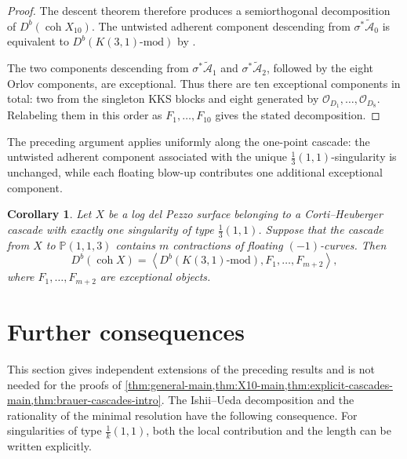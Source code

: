 \documentclass[11pt]{article}
\theoremstyle{plain}
\newtheorem{corollary}[corollary]{Corollary}
\theoremstyle{definition}
\theoremstyle{remark}
\newcommand{\Pp}{\mathbb P}
\newcommand{\Db}{D^b}
\newcommand{\coh}{\operatorname{coh}}
\newcommand{\OO}{\mathcal O}
\begin{document}
\begin{proof}
The descent theorem \cite[Theorem~2.12]{KKS2020} therefore produces a
semiorthogonal decomposition of \(\Db(\coh X_{10})\). The untwisted adherent
component descending from \(\sigma^*\widetilde{\mathcal A}_0\) is equivalent
to \(\Db(K(3,1)\text{-mod})\) by \cite[Theorem~3.16]{KKS2020}.

The two components descending from
\(\sigma^*\widetilde{\mathcal A}_1\) and
\(\sigma^*\widetilde{\mathcal A}_2\), followed by the eight Orlov
components, are exceptional. Thus there are ten exceptional components in
total: two from the singleton KKS blocks and eight generated by
\(\OO_{D_1},\dots,\OO_{D_8}\). Relabeling them in this order as
\(F_1,\dots,F_{10}\) gives the stated decomposition.
\end{proof}

The preceding argument applies uniformly along the one-point cascade: the
untwisted adherent component associated with the unique
\(\frac13(1,1)\)-singularity is unchanged, while each floating blow-up
contributes one additional exceptional component.

\begin{corollary}\label{cor:one-point-kks-sod}
Let \(X\) be a log del Pezzo surface belonging to a Corti--Heuberger cascade
with exactly one singularity of type \(\frac13(1,1)\). Suppose that the
cascade from \(X\) to \(\Pp(1,1,3)\) contains \(m\) contractions of floating
\((-1)\)-curves. Then
\[
\Db(\coh X)
=
\left\langle
\Db(K(3,1)\text{-mod}),F_1,\dots,F_{m+2}
\right\rangle,
\]
where \(F_1,\dots,F_{m+2}\) are exceptional objects.
\end{corollary}

\section{Further consequences}
\label{sec:further-directions}

This section gives independent extensions of the preceding results and is
not needed for the proofs of
\cref{thm:general-main,thm:X10-main,thm:explicit-cascades-main,thm:brauer-cascades-intro}.
The Ishii--Ueda decomposition and the rationality of the minimal resolution
have the following consequence. For singularities of type
\(\frac1k(1,1)\), both the local contribution and the length can be written
explicitly.
\end{document}
